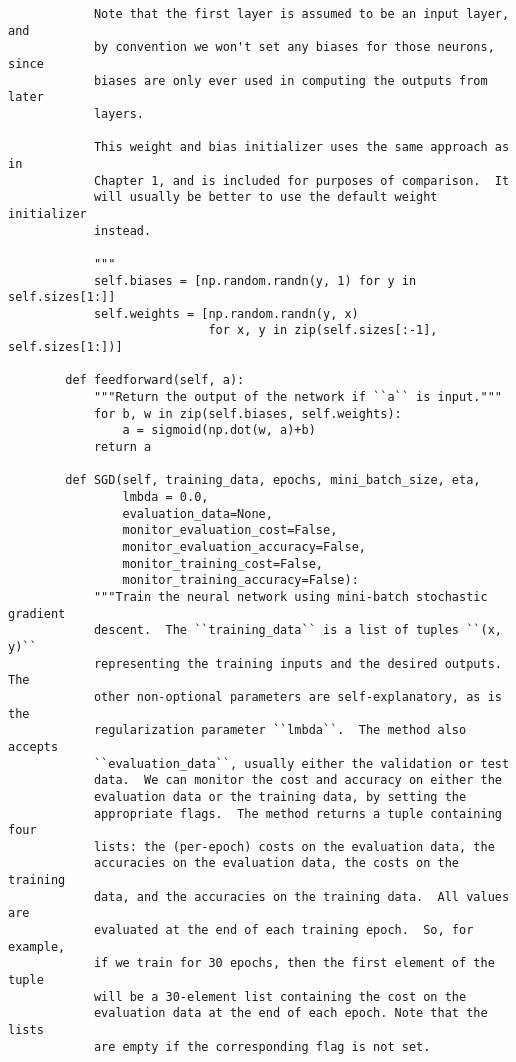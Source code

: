 \begin{lstlisting}
            Note that the first layer is assumed to be an input layer, and
            by convention we won't set any biases for those neurons, since
            biases are only ever used in computing the outputs from later
            layers.
    
            This weight and bias initializer uses the same approach as in
            Chapter 1, and is included for purposes of comparison.  It
            will usually be better to use the default weight initializer
            instead.
    
            """
            self.biases = [np.random.randn(y, 1) for y in self.sizes[1:]]
            self.weights = [np.random.randn(y, x)
                            for x, y in zip(self.sizes[:-1], self.sizes[1:])]
    
        def feedforward(self, a):
            """Return the output of the network if ``a`` is input."""
            for b, w in zip(self.biases, self.weights):
                a = sigmoid(np.dot(w, a)+b)
            return a
    
        def SGD(self, training_data, epochs, mini_batch_size, eta,
                lmbda = 0.0,
                evaluation_data=None,
                monitor_evaluation_cost=False,
                monitor_evaluation_accuracy=False,
                monitor_training_cost=False,
                monitor_training_accuracy=False):
            """Train the neural network using mini-batch stochastic gradient
            descent.  The ``training_data`` is a list of tuples ``(x, y)``
            representing the training inputs and the desired outputs.  The
            other non-optional parameters are self-explanatory, as is the
            regularization parameter ``lmbda``.  The method also accepts
            ``evaluation_data``, usually either the validation or test
            data.  We can monitor the cost and accuracy on either the
            evaluation data or the training data, by setting the
            appropriate flags.  The method returns a tuple containing four
            lists: the (per-epoch) costs on the evaluation data, the
            accuracies on the evaluation data, the costs on the training
            data, and the accuracies on the training data.  All values are
            evaluated at the end of each training epoch.  So, for example,
            if we train for 30 epochs, then the first element of the tuple
            will be a 30-element list containing the cost on the
            evaluation data at the end of each epoch. Note that the lists
            are empty if the corresponding flag is not set.
    

\end{lstlisting}

